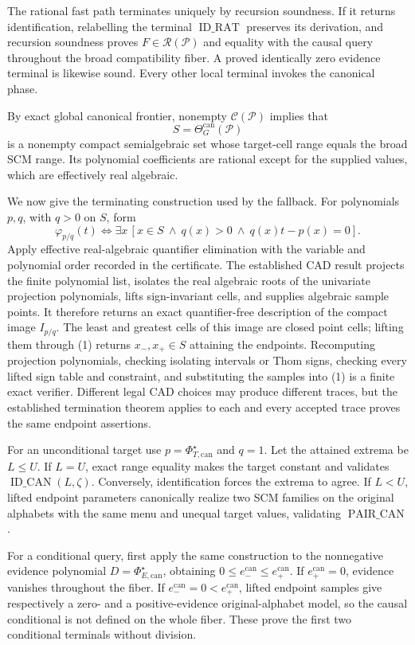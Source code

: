 The rational fast path terminates uniquely by recursion soundness.  If it returns identification, relabelling the terminal \(\operatorname{ID\_RAT}\) preserves its derivation, and recursion soundness proves \(F\in\mathscr R(\mathcal P)\) and equality with the causal query throughout the broad compatibility fiber.  A proved identically zero evidence terminal is likewise sound.  Every other local terminal invokes the canonical phase.

By exact global canonical frontier, nonempty \(\mathcal C(\mathcal P)\) implies that
\[
S=\Theta_G^{\mathrm{can}}(\mathcal P)
\]
is a nonempty compact semialgebraic set whose target-cell range equals the broad SCM range.  Its polynomial coefficients are rational except for the supplied values, which are effectively real algebraic.

We now give the terminating construction used by the fallback.  For polynomials \(p,q\), with \(q>0\) on \(S\), form
\[
\varphi_{p/q}(t)\Longleftrightarrow
\exists x\,[x\in S\ \wedge\ q(x)>0\ \wedge\ q(x)t-p(x)=0].
\tag{1}
\]
Apply effective real-algebraic quantifier elimination with the variable and polynomial order recorded in the certificate.  The established CAD result projects the finite polynomial list, isolates the real algebraic roots of the univariate projection polynomials, lifts sign-invariant cells, and supplies algebraic sample points.  It therefore returns an exact quantifier-free description of the compact image \(I_{p/q}\).  The least and greatest cells of this image are closed point cells; lifting them through (1) returns \(x_-,x_+\in S\) attaining the endpoints.  Recomputing projection polynomials, checking isolating intervals or Thom signs, checking every lifted sign table and constraint, and substituting the samples into (1) is a finite exact verifier.  Different legal CAD choices may produce different traces, but the established termination theorem applies to each and every accepted trace proves the same endpoint assertions.

For an unconditional target use \(p=\Phi_{T,\mathrm{can}}^\star\) and \(q=1\).  Let the attained extrema be \(L\le U\).  If \(L=U\), exact range equality makes the target constant and validates \(\operatorname{ID\_CAN}(L,\zeta)\).  Conversely, identification forces the extrema to agree.  If \(L<U\), lifted endpoint parameters canonically realize two SCM families on the original alphabets with the same menu and unequal target values, validating \(\operatorname{PAIR\_CAN}\).

For a conditional query, first apply the same construction to the nonnegative evidence polynomial \(D=\Phi_{E,\mathrm{can}}^\star\), obtaining \(0\le e_-^{\mathrm{can}}\le e_+^{\mathrm{can}}\).  If \(e_+^{\mathrm{can}}=0\), evidence vanishes throughout the fiber.  If \(e_-^{\mathrm{can}}=0<e_+^{\mathrm{can}}\), lifted endpoint samples give respectively a zero- and a positive-evidence original-alphabet model, so the causal conditional is not defined on the whole fiber.  These prove the first two conditional terminals without division.

